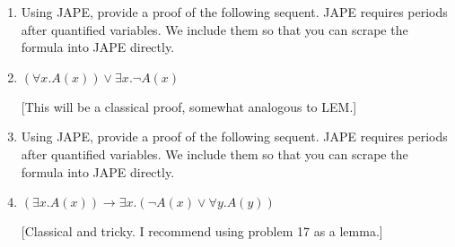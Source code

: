 \documentclass{cs81-homework}
\begin{document}
\begin{enumerate}
  \begin{solution}
  \end{solution}

\item[] Using JAPE, provide a proof of the following sequent. JAPE requires
  periods after quantified variables. We include them so that you can scrape the
  formula into JAPE directly.

\item {} \((\forall x.A(x)) \lor \exists x.\lnot A(x)\)
  
  [This will be a classical proof, somewhat analogous to LEM.]

  \begin{solution}
  \end{solution}

\item[] Using JAPE, provide a proof of the following sequent. JAPE requires
  periods after quantified variables. We include them so that you can scrape the
  formula into JAPE directly.

\item {}
  \((\exists x.A(x)) \to \exists x.(\lnot A(x) \lor \forall y.A(y))\)
  
  [Classical and tricky. I recommend using problem 17 as a lemma.]    

  \begin{solution}
  \end{solution}

\end{enumerate}
\end{document}
